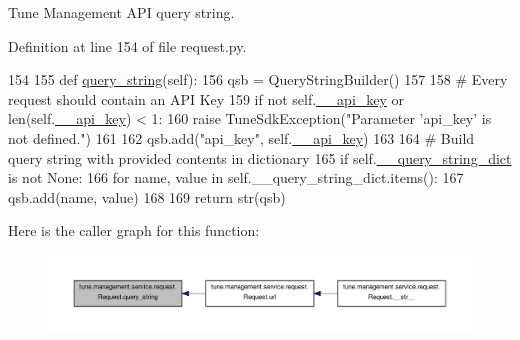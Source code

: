 Tune Management A\-P\-I query string. 



Definition at line 154 of file request.\-py.


\begin{DoxyCode}
154 
155     \textcolor{keyword}{def }\hyperlink{classtune_1_1management_1_1service_1_1request_1_1Request_adfe1bde13c0956896cac9925bd20d723}{query\_string}(self):
156         qsb = QueryStringBuilder()
157 
158         \textcolor{comment}{# Every request should contain an API Key}
159         \textcolor{keywordflow}{if} \textcolor{keywordflow}{not} self.\hyperlink{classtune_1_1management_1_1service_1_1request_1_1Request_a22c60e8b0bc6ebf34ef274bad727c326}{\_\_api\_key} \textcolor{keywordflow}{or} len(self.\hyperlink{classtune_1_1management_1_1service_1_1request_1_1Request_a22c60e8b0bc6ebf34ef274bad727c326}{\_\_api\_key}) < 1:
160             \textcolor{keywordflow}{raise} TuneSdkException(\textcolor{stringliteral}{"Parameter 'api\_key' is not defined."})
161 
162         qsb.add(\textcolor{stringliteral}{"api\_key"}, self.\hyperlink{classtune_1_1management_1_1service_1_1request_1_1Request_a22c60e8b0bc6ebf34ef274bad727c326}{\_\_api\_key})
163 
164         \textcolor{comment}{# Build query string with provided contents in dictionary}
165         \textcolor{keywordflow}{if} self.\hyperlink{classtune_1_1management_1_1service_1_1request_1_1Request_aa260968d316e04dd072fb75d678cd09f}{\_\_query\_string\_dict} \textcolor{keywordflow}{is} \textcolor{keywordflow}{not} \textcolor{keywordtype}{None}:
166             \textcolor{keywordflow}{for} name, value \textcolor{keywordflow}{in} self.\_\_query\_string\_dict.items():
167                 qsb.add(name, value)
168 
169         \textcolor{keywordflow}{return} str(qsb)

\end{DoxyCode}


Here is the caller graph for this function\-:
\nopagebreak
\begin{figure}[H]
\begin{center}
\leavevmode
\includegraphics[width=350pt]{classtune_1_1management_1_1service_1_1request_1_1Request_adfe1bde13c0956896cac9925bd20d723_icgraph}
\end{center}
\end{figure}


